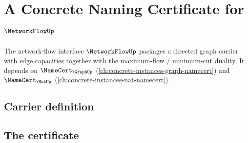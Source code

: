 \chapter{A Concrete Naming Certificate for $\NetworkFlowUp$}
\label{ch:concrete-instances-networkflow-namecert}

The network-flow interface $\NetworkFlowUp$ packages a directed graph carrier with edge capacities together with the maximum-flow / minimum-cut duality. It depends on $\NameCert_{\GraphUp}$ (\autoref{ch:concrete-instances-graph-namecert}) and $\NameCert_{\NatUp}$ (\autoref{ch:concrete-instances-nat-namecert}).

\section{Carrier definition}
\label{sec:networkflow-carrier}

\section{The certificate}
\label{sec:networkflow-certificate}

